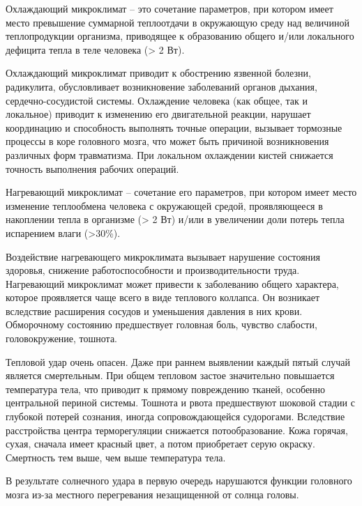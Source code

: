 Охлаждающий микроклимат – это сочетание параметров, при котором имеет место превышение суммарной теплоотдачи в окружающую среду над величиной теплопродукции организма, приводящее к образованию общего и/или локального дефицита тепла в теле человека (> 2 Вт).

Охлаждающий микроклимат приводит к обострению язвенной болезни, радикулита, обусловливает возникновение заболеваний органов дыхания, сердечно-сосудистой системы. Охлаждение человека (как общее, так и локальное) приводит к изменению его двигательной реакции, нарушает координацию и спо­собность выполнять точные операции, вызывает тормозные процессы в коре головного мозга, что может быть причиной возникновения различ­ных форм травматизма. При локальном охлаждении кистей снижается точность выполнения рабочих операций.

Нагревающий микроклимат – сочетание его параметров, при котором имеет место изменение теплообмена человека с окружающей средой, проявляющееся в накоплении тепла в организме (> 2 Вт) и/или в увеличении доли потерь тепла испарением влаги (>30\%).

Воздействие нагревающего микроклимата вызывает нарушение состояния здоровья, снижение работоспособности и производительности труда. Нагревающий микроклимат может привести к заболеванию общего характера, которое проявляется чаще всего в виде теплового коллапса. Он возникает вследствие расширения сосудов и уменьшения давления в них крови. Обморочному состоянию предшествует головная боль, чувство слабости, головокружение, тошнота.

Тепловой удар очень опасен. Даже при раннем выявлении каждый пятый случай является смертельным. При общем тепловом застое значительно повышается температура тела, что приводит к прямому повреждению тканей, особенно центральной периной системы. Тошнота и рвота предшествуют шоковой стадии с глубокой потерей сознания, иногда сопровождающейся судорогами. Вследствие расстройства центра терморегуляции снижается потообразование. Кожа горячая, сухая, сначала имеет красный цвет, а потом приобретает серую окраску. Смертность тем выше, чем выше температура тела.

В результате солнечного удара в первую очередь нарушаются функции головного мозга из-за местного перегревания незащищенной от солнца головы. 

